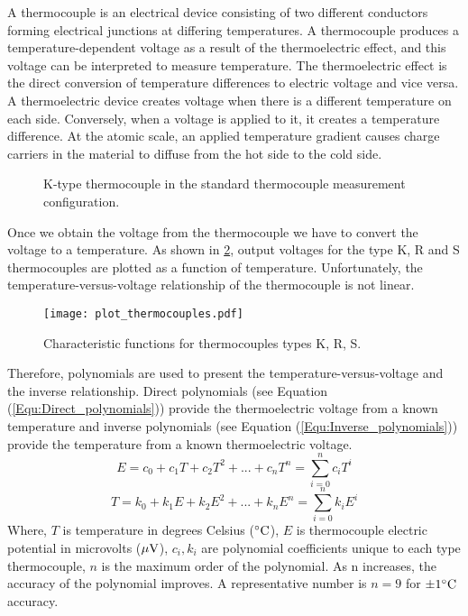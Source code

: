 A thermocouple is an electrical device consisting of two different conductors forming electrical junctions at differing temperatures. A thermocouple produces a temperature-dependent voltage as a result of the thermoelectric effect, and this voltage can be interpreted to measure temperature.
The thermoelectric effect is the direct conversion of temperature differences to electric voltage and vice versa. A thermoelectric device creates voltage when there is a different temperature on each side. Conversely, when a voltage is applied to it, it creates a temperature difference. At the atomic scale, an applied temperature gradient causes charge carriers in the material to diffuse from the hot side to the cold side.
\begin{figure}[!htp]
\centering{}
\caption{K-type thermocouple in the standard thermocouple measurement configuration.}
\label{Fig:Thermocouple_circuit_Ktype_including_voltmeter_temperature}
\end{figure}

Once we obtain the voltage from the thermocouple we have to convert the voltage to a temperature.
As shown in \ref{Fig:plot_thermocouples}, output voltages for the type K, R and S thermocouples are plotted as a function of temperature.
Unfortunately, the temperature-versus-voltage relationship of the thermocouple is not linear.
\begin{figure}[!htp]
\centering
\texttt{[image: plot\_thermocouples.pdf]}
\caption{Characteristic functions for thermocouples types K, R, S.}
\label{Fig:plot_thermocouples}
\end{figure}
Therefore, polynomials are used to present the temperature-versus-voltage and the inverse relationship.
Direct polynomials (see Equation (\ref{Equ:Direct_polynomials})) provide the thermoelectric voltage from a known temperature and inverse polynomials (see Equation (\ref{Equ:Inverse_polynomials})) provide the temperature from a known thermoelectric voltage.
\begin{equation}
\label{Equ:Direct_polynomials}
E = {c_0} + {c_1}T + {c_2}{T^2} + ... + {c_n}{T^n} = \sum\limits_{i = 0}^n {{c_i}{T^i}}
\end{equation}
\begin{equation}
\label{Equ:Inverse_polynomials}
T = {k_0} + {k_1}E + {k_2}{E^2} + ... + {k_n}{E^n} = \sum\limits_{i = 0}^n {{k_i}{E^i}}
\end{equation}
Where, $T$ is temperature in degrees Celsius ($^{\circ} \rm{C}$), $E$ is thermocouple electric potential in microvolts (${\rm{\mu V}}$), $c_i,k_i$ are polynomial coefficients unique to each type thermocouple, $n$ is the maximum order of the polynomial.
As n increases, the accuracy of the polynomial improves.
A representative number is $n = 9$ for $\pm 1 ^{\circ} \rm{C}$ accuracy.

